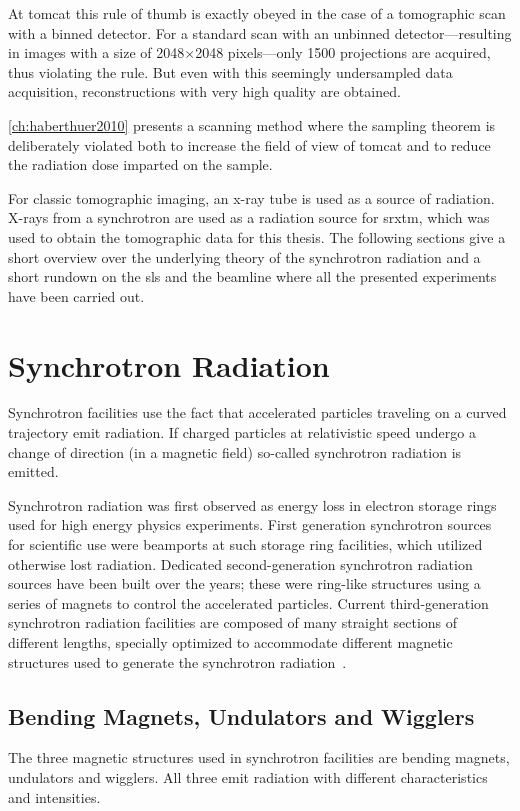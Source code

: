 At \ac{tomcat} this rule of thumb is exactly obeyed in the case of a tomographic scan with a binned detector. For a standard scan with an unbinned detector---resulting in images with a size of 2048$\times$2048 pixels---only 1500 projections are acquired, thus violating the rule. But even with this seemingly undersampled data acquisition, reconstructions with very high quality are obtained.

\autoref{ch:haberthuer2010} presents a scanning method where the sampling theorem is deliberately violated both to increase the field of view of \ac{tomcat} and to reduce the radiation dose imparted on the sample.

For classic tomographic imaging, an x-ray tube is used as a source of radiation. X-rays from a synchrotron are used as a radiation source for \ac{srxtm}, which was used to obtain the tomographic data for this thesis. The following sections give a short overview over the underlying theory of the synchrotron radiation and a short rundown on the \ac{sls} and the beamline where all the presented experiments have been carried out.

\section{Synchrotron Radiation}
Synchrotron facilities use the fact that accelerated particles traveling on a curved trajectory emit radiation. If charged particles at relativistic speed undergo a change of direction (\ie in a magnetic field) so-called synchrotron radiation is emitted. 

Synchrotron radiation was first observed as energy loss in electron storage rings used for high energy physics experiments. First generation synchrotron sources for scientific use were beamports at such storage ring facilities, which utilized otherwise lost radiation. Dedicated second-generation synchrotron radiation sources have been built over the years; these were ring-like structures using a series of magnets to control the accelerated particles. Current third-generation synchrotron radiation facilities are composed of many straight sections of different lengths, specially optimized to accommodate different magnetic structures used to generate the synchrotron radiation~\cite{Stampanoni2002a,Margaritondo2002,wwwsls}. 

\subsection{Bending Magnets, Undulators and Wigglers}
The three magnetic structures used in synchrotron facilities are bending magnets, undulators and wigglers. All three emit radiation with different characteristics and intensities.

